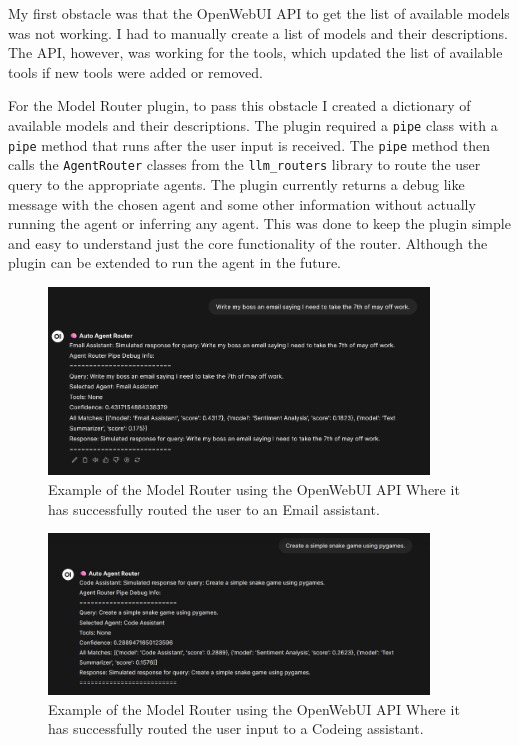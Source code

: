 My first obstacle was that the OpenWebUI API to get the list of available models was not working. I had to manually create a list of models and their descriptions. The API, however, was working for the tools, which updated the list of available tools if new tools were added or removed.

For the Model Router plugin, to pass this obstacle I created a dictionary of available models and their descriptions. The plugin required a \texttt{pipe} class with a \texttt{pipe} method that runs after the user input is received. The \texttt{pipe} method then calls the \texttt{AgentRouter} classes from the \texttt{llm\_routers} library to route the user query to the appropriate agents. The plugin currently returns a debug like message with the chosen agent and some other information without actually running the agent or inferring any agent. This was done to keep the plugin simple and easy to understand just the core functionality of the router. Although the plugin can be extended to run the agent in the future.

\begin{figure}[H]
    \centering
    \includegraphics[width=0.9\textwidth]{figures/owui-agent-demo-0.png}
    \caption{Example of the Model Router using the OpenWebUI API Where it has successfully routed the user to an Email assistant.}
    \label{fig:model_router_plugin_demo_0}
\end{figure}

\begin{figure}[H]
    \centering
    \includegraphics[width=0.9\textwidth]{figures/owui-agent-demo-1.png}
    \caption{Example of the Model Router using the OpenWebUI API Where it has successfully routed the user input to a Codeing assistant.}
    \label{fig:model_router_plugin_demo_1}
\end{figure}

